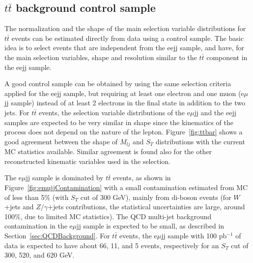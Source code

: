 \subsection{$t\bar{t}$ background control sample} \label{sec:ttbarControlSample}

The normalization and the shape of the main selection variable distributions for 
$t\bar{t}$ events can be estimated directly from data using a control sample. 
The basic idea is to select events that are independent from the eejj sample, and have, for the main selection variables, 
shape and resolution similar to the $t\bar{t}$ component in the eejj sample.

A good control sample can be obtained by using the same selection criteria applied for the eejj sample, but 
requiring at least one electron and one muon (e$\mu$jj sample) instead of at least 2 electrons 
in the final state in addition to the two jets. 
For $t\bar{t}$ events, the selection variable distributions of the e$\mu$jj and the eejj samples
are expected to be very similar in shape since the kinematics of the process does not depend 
on the nature of the lepton. Figure~\ref{fig:ttbar} shows a good agreement between 
the shape of $M_{lj}$ and $S_{T}$ distributions with the current MC statistics available. Similar agreement 
is found also for the other reconstructed kinematic variables used in the selection. 

The e$\mu$jj sample is dominated by $t\bar{t}$ events, as shown in Figure~\ref{fig:emujjContamination} 
with a small contamination estimated from MC of less than 5\% (with $S_{T}$ cut of 300 GeV), 
mainly from di-boson events (for $W$+jets and $Z/\gamma$+jets contributions, the statistical 
uncertainties are large, around 100\%, due to limited MC statistics). 
The QCD multi-jet background contamination in the e$\mu$jj sample is expected to be small, as described 
in Section~\ref{sec:QCDBackground}. 
For $t\bar{t}$ events, the e$\mu$jj sample with 100 pb$^{-1}$ of data 
is expected to have about 66, 11, and 5 events, respectively for an $S_{T}$ cut of 300, 520, and 620 GeV.

